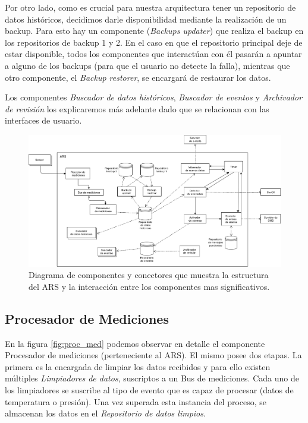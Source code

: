 \par Por otro lado, como es crucial para nuestra arquitectura tener un repositorio de datos históricos, decidimos darle disponibilidad mediante la realización de un backup. Para esto hay un componente (\textit{Backups updater}) que realiza el backup en los repositorios de backup 1 y 2. En el caso en que el repositorio principal deje de estar disponible, todos los componentes que interactúan con él pasarán a apuntar a alguno de los backups (para que el usuario no detecte la falla), mientras que otro componente, el \textit{Backup restorer}, se encargará de restaurar los datos. \\

\par Los componentes \textit{Buscador de datos históricos}, \textit{Buscador de eventos} y \textit{Archivador de revisión} los explicaremos más adelante dado que se relacionan con las interfaces de usuario.

\newpage
\begin{figure}[H]
  \centering
  \includegraphics[angle=-90,scale=0.52]{imagenes/diagramas/core.png}
  \caption{Diagrama de componentes y conectores que muestra la estructura del ARS y la interacción entre los componentes mas significativos.}
  \label{fig:dia_cyc_core}
\end{figure}
\newpage

\subsection{Procesador de Mediciones}

En la figura \ref{fig:proc_med} podemos observar en detalle el componente Procesador de mediciones (perteneciente al ARS). El mismo posee dos etapas. La primera es la encargada de limpiar los datos recibidos y para ello existen múltiples \textit{Limpiadores de datos}, suscriptos a un Bus de mediciones. Cada uno de los limpiadores se suscribe al tipo de evento que es capaz de procesar (datos de temperatura o presión). Una vez superada esta instancia del proceso, se almacenan los datos en el \textit{Repositorio de datos limpios}. \\

